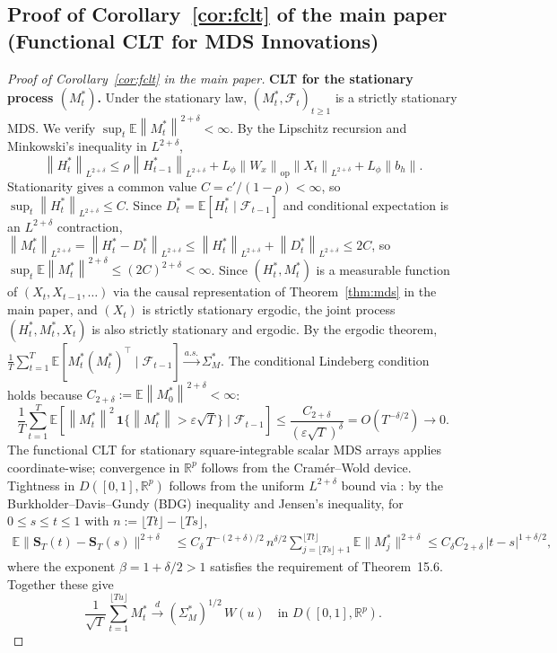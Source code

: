 \documentclass[bj,authoryear]{imsart}
\theoremstyle{plain}
\theoremstyle{definition}
\newcommand{\E}{\mathbb{E}}
\newcommand{\R}{\mathbb{R}}
\newcommand{\F}{\mathcal{F}}
\newcommand{\norm}[1]{\left\lVert #1 \right\rVert}
\newcommand{\given}{\mid}
\begin{document}
\subsection{Proof of Corollary~\ref{cor:fclt} of the main paper (Functional CLT for MDS Innovations)}
\label{app:proof-corfclt}

\begin{proof}[Proof of Corollary~\ref{cor:fclt} in the main paper]
  \textbf{CLT for the stationary process $(M_t^*)$.}
  Under the stationary law, $(M_t^*, \F_t)_{t\geq 1}$ is a strictly
  stationary MDS.  We verify $\sup_t\E\norm{M_t^*}^{2+\delta}<\infty$.
  By the Lipschitz recursion and Minkowski's inequality in $L^{2+\delta}$,
  \[
    \norm{H_t^*}_{L^{2+\delta}}
    \leq \rho\norm{H_{t-1}^*}_{L^{2+\delta}}
       + L_\phi\norm{W_x}_{\mathrm{op}}\norm{X_t}_{L^{2+\delta}}
       + L_\phi\norm{b_h}.
  \]
  Stationarity gives a common value $C = c'/(1-\rho) < \infty$, so $\sup_t\norm{H_t^*}_{L^{2+\delta}} \leq C$.
  Since $D_t^* = \E[H_t^*\given\F_{t-1}]$ and conditional expectation is an $L^{2+\delta}$ contraction,
  $\norm{M_t^*}_{L^{2+\delta}} = \norm{H_t^* - D_t^*}_{L^{2+\delta}} \leq \norm{H_t^*}_{L^{2+\delta}} + \norm{D_t^*}_{L^{2+\delta}} \leq 2C$,
  so $\sup_t\E\norm{M_t^*}^{2+\delta} \leq (2C)^{2+\delta} < \infty$.
  Since $(H_t^*, M_t^*)$ is a measurable function of $(X_t, X_{t-1}, \ldots)$ via the causal representation of Theorem~\ref{thm:mds} in the main paper, and $(X_t)$ is strictly stationary ergodic, the joint process $(H_t^*, M_t^*, X_t)$ is also strictly stationary and ergodic.
  By the ergodic theorem,
  $\frac{1}{T}\sum_{t=1}^T\E[M_t^*(M_t^*)^\top\given\F_{t-1}] \xrightarrow{a.s.} \Sigma_M^*$.
  The conditional Lindeberg condition holds because $C_{2+\delta}:=\E\norm{M_0^*}^{2+\delta}<\infty$:
  \[
    \frac{1}{T}\sum_{t=1}^T
    \E\!\left[\norm{M_t^*}^2\,\mathbf{1}\{\norm{M_t^*}>\varepsilon\sqrt{T}\}
       \given\F_{t-1}\right]
    \leq \frac{C_{2+\delta}}{(\varepsilon\sqrt{T})^\delta} = O(T^{-\delta/2}) \to 0.
  \]
  The functional CLT for stationary square-integrable scalar MDS arrays
  \citep[Theorem~4.1]{hall1980martingale} applies coordinate-wise; convergence
  in $\R^p$ follows from the Cram\'er--Wold device.
  Tightness in $D([0,1],\R^p)$ follows from the uniform $L^{2+\delta}$ bound
  via \citet[Theorem~15.6]{billingsley1999convergence}: by the
  Burkholder--Davis--Gundy (BDG) inequality and Jensen's inequality,
  for $0\leq s\leq t\leq 1$ with $n:=\lfloor Tt\rfloor-\lfloor Ts\rfloor$,
  \begin{align*}
    \E\|\mathbf{S}_T(t)-\mathbf{S}_T(s)\|^{2+\delta}
    &\leq C_\delta\,T^{-(2+\delta)/2}\,n^{\delta/2}
        \sum_{j=\lfloor Ts\rfloor+1}^{\lfloor Tt\rfloor}\E\|M_j^*\|^{2+\delta}
    \leq C_\delta C_{2+\delta}\,|t-s|^{1+\delta/2},
  \end{align*}
  where the exponent $\beta = 1 + \delta/2 > 1$ satisfies the requirement
  of Theorem~15.6.  Together these give
  \[
    \frac{1}{\sqrt{T}}\sum_{t=1}^{\lfloor Tu\rfloor} M_t^*
    \xrightarrow{d} (\Sigma_M^*)^{1/2}\,W(u)
    \quad\text{in }D([0,1],\R^p).
  \]


\end{proof}
\end{document}
